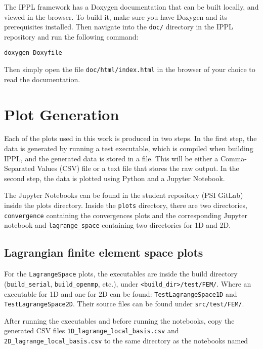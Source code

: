 The IPPL framework has a Doxygen documentation that can be built locally,
and viewed in the browser.
To build it, make sure you have Doxygen and its prerequisites installed.
Then navigate into the \texttt{doc/} directory in the IPPL repository
and run the following command:

\begin{verbatim}
doxygen Doxyfile
\end{verbatim}

Then simply open the file \texttt{doc/html/index.html} in the browser of your choice to read the
documentation.

\pagebreak

\section{Plot Generation}

Each of the plots used in this work is produced in two steps.
In the first step, the data is generated by running a test executable, which is compiled when building IPPL,
and the generated data is stored in a file. This will be either a Comma-Separated Values (CSV) file
or a text file that stores the raw output.
In the second step, the data is plotted using Python and a Jupyter Notebook.

The Jupyter Notebooks can be found in the student repository (PSI GitLab) inside the plots directory.
Inside the \texttt{plots} directory, there are two directories,
\texttt{convergence} containing the convergences plots and the corresponding Jupyter notebook
and \texttt{lagrange\_space} containing two directories for 1D and 2D.

\subsection{Lagrangian finite element space plots}

For the \texttt{LagrangeSpace} plots, the executables are inside the build directory
(\texttt{build\_serial}, \texttt{build\_openmp}, etc.), under \texttt{<build\_dir>/test/FEM/}.
Where an executable for 1D and one for 2D can be found: \texttt{TestLagrangeSpace1D} and \texttt{TestLagrangeSpace2D}.
Their source files can be found under \texttt{src/test/FEM/}.

After running the executables and before running the notebooks, copy the generated CSV files \texttt{1D\_lagrange\_local\_basis.csv} and
\texttt{2D\_lagrange\_local\_basis.csv} to the same directory as the notebooks named

